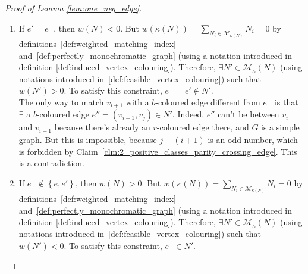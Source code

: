 \begin{proof}[Proof of Lemma \ref{lem:one_neg_edge}]
\begin{enumerate}
\begin{enumerate}
                The only way to match $v_i$ with a $b$-coloured edge different from $e^-$ is that $\exists$ a $b$-coloured edge $e'' = (v_i, v_k) \in N'$.
                Indeed, $e''$ can't be between $v_i$ and $v_{i+1}$ because there's already an $r$-coloured edge there, and $G$ is a simple graph.
                But this is impossible, because $k-i$ is an odd number, which is forbidden by Claim~\ref{clm:2_positive_classes_parity_crossing_edge}.
                This is a contradiction.

            \item If $e' = e^-$, then $w(N) < 0$.
                But $w(\kappa(N)) = \sum\limits_{N_i \in \mathcal{M}_{\kappa(N)}} N_i = 0$ by definitions~\ref{def:weighted_matching_index} and~\ref{def:perfectly_monochromatic_graph} (using a notation introduced in definition \ref{def:induced_vertex_colouring}).
                Therefore, $\exists N' \in \mathcal{M}_\kappa(N)$ (using notations introduced in~\ref{def:feasible_vertex_colouring}) such that $w(N') > 0$.
                To satisfy this constraint, $e^- = e' \notin N'$.\\

                The only way to match $v_{i+1}$ with a $b$-coloured edge different from $e^-$ is that $\exists$ a $b$-coloured edge $e'' = (v_{i+1}, v_j) \in N'$.
                Indeed, $e''$ can't be between $v_i$ and $v_{i+1}$ because there's already an $r$-coloured edge there, and $G$ is a simple graph.
                But this is impossible, because $j - (i+1)$ is an odd number, which is forbidden by Claim~\ref{clm:2_positive_classes_parity_crossing_edge}.
                This is a contradiction.

            \item If $e^- \notin \left\{ e, e' \right\}$, then $w(N) > 0$.
                But $w(\kappa(N)) = \sum\limits_{N_i \in \mathcal{M}_{\kappa(N)}} N_i = 0$ by definitions~\ref{def:weighted_matching_index} and~\ref{def:perfectly_monochromatic_graph} (using a notation introduced in definition \ref{def:induced_vertex_colouring}).
                Therefore, $\exists N' \in \mathcal{M}_\kappa(N)$ (using notations introduced in~\ref{def:feasible_vertex_colouring}) such that $w(N') < 0$.
                To satisfy this constraint, $e^- \in N'$.\\


\end{enumerate}
\end{enumerate}
\end{proof}

